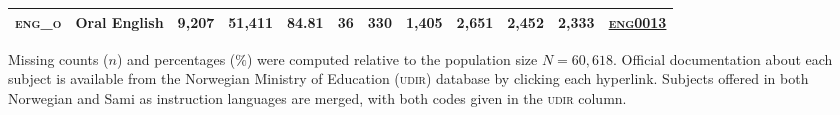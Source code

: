 {\begin{tabular}{clrrrrrrrrrl}
    \textsc{eng\_o} & Oral English & 9,207 & 51,411 & 84.81 & 36    & 330   & 1,405 & 2,651 & 2,452 & 2,333 & \href{https://www.udir.no/lk20/fagkoder/eng0013}{\textsc{eng0013}} \\
        \bottomrule
    \end{tabular}%
}{
    Missing counts ($n$) and percentages ($\%$) were computed relative to the population size $N = 60,618$. Official documentation about each subject is available from the Norwegian Ministry of Education (\textsc{udir}) database by clicking each hyperlink. Subjects offered in both Norwegian and Sami as instruction languages are merged, with both codes given in the \textsc{udir} column.
}